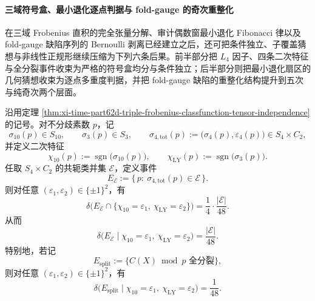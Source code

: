 \paragraph{三域符号盒、最小退化逐点判据与 fold-gauge 的奇次重整化}
在三域 Frobenius 直积的完全张量分解、审计偶数窗最小退化 Fibonacci 律以及 fold-gauge 缺陷序列的 Bernoulli 剥离已经建立之后，还可把条件独立、子覆盖猜想与非线性正规形继续压缩为下列六条后果。前半部分把 \(L_4\) 因子、四条二次特征与全分裂事件收束为严格的符号盒均分与条件独立；后半部分则把最小退化扇区的几何猜想收束为逐点多重度判据，并把 fold-gauge 缺陷的重整化结构提升到五次与纯奇次两个层面。

\begin{theorem}\label{thm:xi-time-part64a-l4-event-complete-conditional-independence}
沿用定理 \ref{thm:xi-time-part62d-triple-frobenius-classfunction-tensor-independence} 的记号。对不分歧素数 \(p\)，记
\[
\sigma_{10}(p)\in S_{10},
\qquad
\sigma_{3}(p)\in S_3,
\qquad
\sigma_{4,\mathrm{tot}}(p):=\bigl(\sigma_4(p),\varepsilon_4(p)\bigr)\in S_4\times C_2,
\]
并定义二次特征
\[
\chi_{10}(p):=\operatorname{sgn}\!\bigl(\sigma_{10}(p)\bigr),
\qquad
\chi_{\mathrm{LY}}(p):=\operatorname{sgn}\!\bigl(\sigma_3(p)\bigr).
\]
任取 \(S_4\times C_2\) 的共轭类并集 \(\mathcal E\)，定义事件
\[
E_{\mathcal E}:=\{\,p:\ \sigma_{4,\mathrm{tot}}(p)\in\mathcal E\,\}.
\]
则对任意 \((\varepsilon_1,\varepsilon_2)\in\{\pm1\}^2\)，有
\[
\delta\!\bigl(
E_{\mathcal E}\cap\{\chi_{10}=\varepsilon_1,\ \chi_{\mathrm{LY}}=\varepsilon_2\}
\bigr)
=
\frac{1}{4}\cdot \frac{|\mathcal E|}{48}.
\]
从而
\[
\delta\!\bigl(
E_{\mathcal E}\mid \chi_{10}=\varepsilon_1,\ \chi_{\mathrm{LY}}=\varepsilon_2
\bigr)
=
\frac{|\mathcal E|}{48}.
\]
特别地，若记
\[
E_{\mathrm{split}}:=\{\text{\(C(X)\bmod p\) 全分裂}\},
\]
则对任意 \((\varepsilon_1,\varepsilon_2)\in\{\pm1\}^2\)，有
\[
\delta\!\bigl(E_{\mathrm{split}}\mid \chi_{10}=\varepsilon_1,\ \chi_{\mathrm{LY}}=\varepsilon_2\bigr)=\frac{1}{48}.
\]
\end{theorem}
